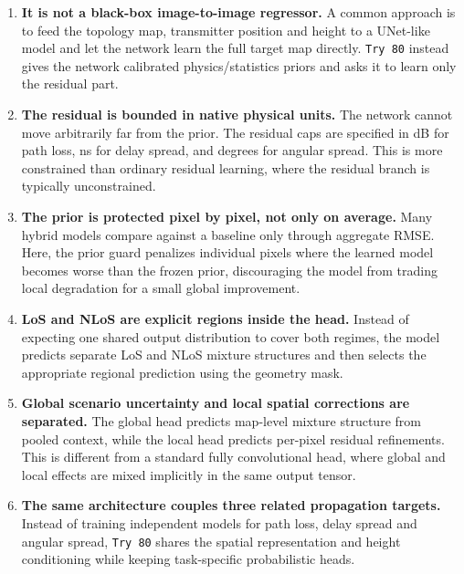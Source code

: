 \documentclass[11pt,a4paper]{article}
\begin{document}
\begin{enumerate}
\item \textbf{It is not a black-box image-to-image regressor.}
      A common approach is to feed the topology map, transmitter position and
      height to a UNet-like model and let the network learn the full target
      map directly. \texttt{Try 80} instead gives the network calibrated
      physics/statistics priors and asks it to learn only the residual part.

\item \textbf{The residual is bounded in native physical units.}
      The network cannot move arbitrarily far from the prior. The residual caps
      are specified in dB for path loss, ns for delay spread, and degrees for
      angular spread. This is more constrained than ordinary residual learning,
      where the residual branch is typically unconstrained.

\item \textbf{The prior is protected pixel by pixel, not only on average.}
      Many hybrid models compare against a baseline only through aggregate RMSE.
      Here, the prior guard penalizes individual pixels where the learned model
      becomes worse than the frozen prior, discouraging the model from trading
      local degradation for a small global improvement.

\item \textbf{LoS and NLoS are explicit regions inside the head.}
      Instead of expecting one shared output distribution to cover both regimes,
      the model predicts separate LoS and NLoS mixture structures and then
      selects the appropriate regional prediction using the geometry mask.

\item \textbf{Global scenario uncertainty and local spatial corrections are
      separated.}
      The global head predicts map-level mixture structure from pooled context,
      while the local head predicts per-pixel residual refinements. This is
      different from a standard fully convolutional head, where global and
      local effects are mixed implicitly in the same output tensor.

\item \textbf{The same architecture couples three related propagation targets.}
      Instead of training independent models for path loss, delay spread and
      angular spread, \texttt{Try 80} shares the spatial representation and
      height conditioning while keeping task-specific probabilistic heads.


\end{enumerate}
\end{document}
